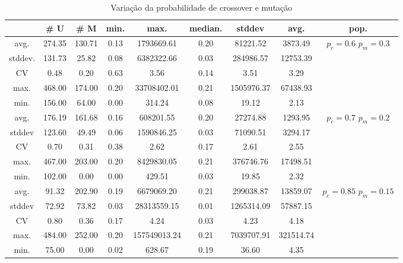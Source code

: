 \documentclass[a4paper]{paper}
\begin{document}
\begin{table}
  \center
  \caption{Variação da probabilidade de crossover e mutação}
  \label{tbl:var_cross_mut}
  \begin{tabular}{| c | c | c | c | c | c | c | c | c |}
    \hline
    &  \# U & \# M & min. & max. & median. & stddev & avg. & pop. \\ \hline
    avg.    & 274.35 & 130.71 & 0.13 & 1793669.61 & 0.20 & 81221.52 & 3873.49 &  \\ 
    stddev. & 131.73 & 25.82 & 0.08 & 6382322.66 & 0.03 & 284986.57 & 12753.39 & \\ 
    CV      & 0.48 & 0.20 & 0.63 & 3.56 & 0.14 & 3.51 & 3.29 & \\ 
    max.    & 468.00 & 174.00 & 0.20 & 33708402.01 & 0.21 & 1505976.37 & 67438.93 & \\ 
    min.    & 156.00 & 64.00 & 0.00 & 314.24 & 0.08 & 19.12 & 2.13 & \\ \hline \hline
    avg.    & 176.19 & 161.68 & 0.16 & 608201.55 & 0.20 & 27274.88 & 1293.95 &  \\ 
    stddev  & 123.60 & 49.49 & 0.06 & 1590846.25 & 0.03 & 71090.51 & 3294.17 & \\ 
    CV      & 0.70 & 0.31 & 0.38 & 2.62 & 0.17 & 2.61 & 2.55 & \\ 
    max.    & 467.00 & 203.00 & 0.20 & 8429830.05 & 0.21 & 376746.76 & 17498.51 & \\ 
    min.    & 102.00 & 0.00 & 0.00 & 429.51 & 0.03 & 19.85 & 2.32 & \\ \hline \hline
    avg.    & 91.32 & 202.90 & 0.19 & 6679069.20 & 0.21 & 299038.87 & 13859.07 &  \\ 
    stddev  & 72.92 & 73.82 & 0.03 & 28313559.15 & 0.01 & 1265314.09 & 57887.15 & \\ 
    CV      & 0.80 & 0.36 & 0.17 & 4.24 & 0.03 & 4.23 & 4.18 & \\ 
    max.    & 484.00 & 252.00 & 0.20 & 157549013.24 & 0.21 & 7039707.91 & 321514.74 & \\ 
    min.    & 75.00 & 0.00 & 0.02 & 628.67 & 0.19 & 36.60 & 4.35 & \\ \hline \hline
  \end{tabular}
\end{table}
\end{document}
